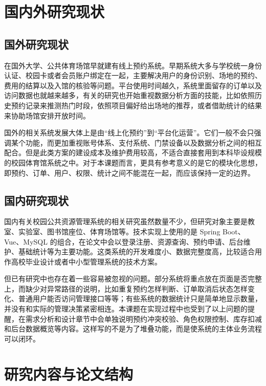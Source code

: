 \section{国内外研究现状}

\subsection{国外研究现状}

在国外大学、公共体育场馆早就建有线上预约系统。早期系统大多与学校统一身份认证、校园卡或者会员账户绑定在一起，主要解决用户的身份识别、场地的预约、费用的结算以及入馆的核验等问题\cite{feng2026}。平台使用时间越久，系统里面留存的订单以及访问数据也就越来越多，有关的研究也开始重视数据分析方面的技能，比如依照历史预约记录来推测热门时段，依照项目偏好给出场地的推荐，或者借助统计的结果来协助场馆安排开放时间\cite{ding2026}。

国外的相关系统发展大体上是由“线上化预约”到“平台化运营”。它们一般不会只强调某个功能，而更加重视账号体系、支付系统、门禁设备以及数据分析之间的相互配合。但是此类方案的建设成本及维护费用较高，不适合直接套用到本科毕设规模的校园体育馆系统之中。对于本课题而言，更具有参考意义的是它的模块化思想，即预约、订单、用户、权限、统计之间不能混在一起，而应该保持一定的边界。

\subsection{国内研究现状}

国内有关校园公共资源管理系统的相关研究虽然数量不少，但研究对象主要是教室、实验室、图书馆座位、体育场馆等。技术实现上使用的是 Spring Boot、Vue、MySQL 的组合，在论文中会以登录注册、资源查询、预约申请、后台维护、基础统计等为主要功能\cite{zhang2022}。这类系统的开发难度小、数据完整度高，比较适合用作高校毕业设计或者中小型管理系统的技术方案\cite{lin2022}。

但已有研究中也存在着一些容易被忽视的问题。部分系统将重点放在页面是否完整上，而缺少对异常路径的说明，比如重复预约怎样判断、订单取消后状态怎样变化、普通用户能否访问管理接口等等；有些系统的数据统计只是简单地显示数量，并没有和实际的管理决策紧密相连\cite{luo2021}。本课题在实现过程中也受到了以上问题的提醒，在需求分析和设计章节中会单独说明预约冲突校验、角色权限控制、库存扣减和后台数据概览等内容。这样写的不是为了堆叠功能，而是使系统的主体业务流程可以闭环。

\section{研究内容与论文结构}

